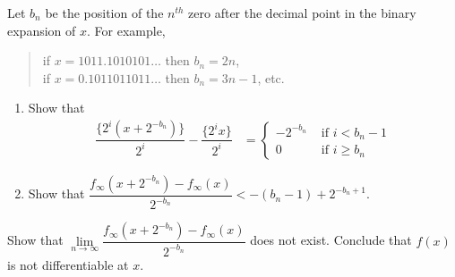 \documentclass[9pt, a4paper, oneside, reqno]{amsart}
\begin{document}
Let $ b_n$ be the position of the $ n^{th}$ zero after the decimal point in the binary expansion of $ x$.
	For example,
	\begin{quote}
		{if $ x = 1011.1010101\dots$ then $ b_n =2n$,}\\
	{if $ x = 0.1011011011\dots$ then $ b_n =3n-1$, etc.}
\end{quote}
\begin{questions}[resume]
	\item
	\begin{enumerate}
		\item Show that
		\begin{align*}
			\dfrac{\{ 2^i(x + 2^{-b_n})\}}{2^{i}} - \dfrac{\{ 2^i x\}}{2^{i}}
			&=
			\begin{cases}
				-2^{-b_n} & \mbox { if }i < b_n - 1 \\
				0 & \mbox { if }i \ge b_n
			\end{cases}
		\end{align*}
		\item Show that $ \dfrac{f_\infty(x + 2^{-b_n}) - f_\infty(x)}{2^{-b_n}} < -(b_n - 1) + 2^{-b_n+1}$.
	\end{enumerate}
	\item Show that $ \lim \limits_{n \rightarrow \infty} \dfrac{f_\infty(x + 2^{-b_n}) - f_\infty(x)}{2^{-b_n}}$ does not exist. Conclude that $ f(x)$ is not differentiable at $ x$.
\end{questions}





\newpage
\end{document}
